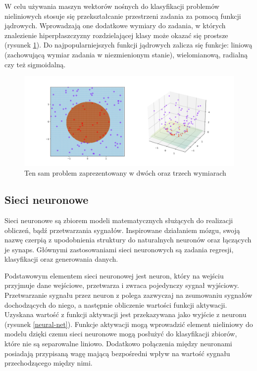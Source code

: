 \documentclass[a4paper, twoside, 11pt, openright]{article}
\begin{document}
W celu używania maszyn wektorów nośnych do klasyfikacji problemów nieliniowych stosuje się przekształcanie przestrzeni zadania za pomocą funkcji jądrowych. Wprowadzają one dodatkowe wymiary do zadania, w których znalezienie hiperpłaszczyzny rozdzielającej klasy może okazać się prostsze (rysunek \ref{wiki_svm2}). Do najpopularniejszych funkcji jądrowych zalicza się funkcje: liniową (zachowującą wymiar zadania w niezmienionym stanie), wielomianową, radialną czy też sigmoidalną.


\begin{figure}[H]
\centering \includegraphics[scale=0.2]{img/svm2.png}
\caption{Ten sam problem zaprezentowany w dwóch oraz trzech wymiarach \cite{wikisvm}}
\label{wiki_svm2}
\end{figure}


\subsection{Sieci neuronowe \cite{neural-nets}}

Sieci neuronowe są zbiorem modeli matematycznych służących do realizacji obliczeń, bądź przetwarzania sygnałów. Inspirowane działaniem mózgu, swoją nazwę czerpią z upodobnienia struktury do naturalnych neuronów oraz łączących je synaps. Głównymi zastosowaniami sieci neuronowych są zadania regresji, klasyfikacji oraz generowania danych. 

\bigskip

Podstawowym elementem sieci neuronowej jest neuron, który na wejściu przyjmuje dane wejściowe, przetwarza i zwraca pojedynczy sygnał wyjściowy. Przetwarzanie sygnału przez neuron z polega zazwyczaj na zsumowaniu sygnałów dochodzących do niego, a następnie obliczenie wartości funkcji aktywacji. Uzyskana wartość z funkcji aktywacji jest przekazywana jako wyjście z neuronu (rysunek \ref{neural-net}). Funkcje aktywacji mogą wprowadzić element nieliniowy do modelu dzięki czemu sieci neuronowe mogą posłużyć do klasyfikacji zbiorów, które nie są separowalne liniowo. Dodatkowo połączenia między neuronami posiadają przypisaną wagę mającą bezpośredni wpływ na wartość sygnału przechodzącego między nimi.
\end{document}

